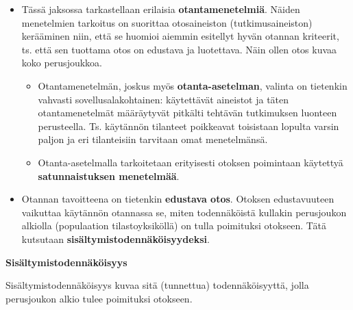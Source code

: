 \documentclass[
]{book}
\providecommand{\tightlist}{%
  \setlength{\itemsep}{0pt}\setlength{\parskip}{0pt}}
\begin{document}
\begin{itemize}
\tightlist
\item
  Tässä jaksossa tarkastellaan erilaisia \textbf{otantamenetelmiä}. Näiden menetelmien tarkoitus on suorittaa otosaineiston (tutkimusaineiston) kerääminen niin, että se huomioi aiemmin esitellyt hyvän otannan kriteerit, ts. että sen tuottama otos on edustava ja luotettava. Näin ollen otos kuvaa koko perusjoukkoa.

  \begin{itemize}
  \tightlist
  \item
    Otantamenetelmän, joskus myös \textbf{otanta-asetelman}, valinta on tietenkin vahvasti sovellusalakohtainen: käytettävät aineistot ja täten otantamenetelmät määräytyvät pitkälti tehtävän tutkimuksen luonteen perusteella. Ts. käytännön tilanteet poikkeavat toisistaan lopulta varsin paljon ja eri tilanteisiin tarvitaan omat menetelmänsä.
  \item
    Otanta-asetelmalla tarkoitetaan erityisesti otoksen poimintaan käytettyä \textbf{satunnaistuksen menetelmää}.
  \end{itemize}
\item
  Otannan tavoitteena on tietenkin \textbf{edustava otos}. Otoksen edustavuuteen vaikuttaa käytännön otannassa se, miten todennäköistä kullakin perusjoukon alkiolla (populaation tilastoyksiköllä) on tulla poimituksi otokseen. Tätä kutsutaan \textbf{sisältymistodennäköisyydeksi}.
\end{itemize}

\begin{defblock}{}
\textbf{Sisältymistodennäköisyys}

Sisältymistodennäköisyys kuvaa sitä (tunnettua) todennäköisyyttä, jolla perusjoukon alkio tulee poimituksi otokseen.

\end{defblock}
\end{document}
